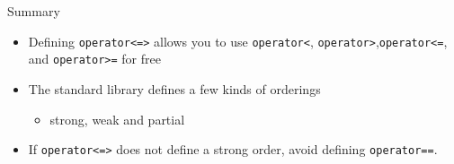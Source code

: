 \begin{frame}[fragile]
  \begin{block}{Summary}
    \begin{itemize}
      \item Defining \texttt{operator<=>} allows you to use \texttt{operator<}, \texttt{operator>},\texttt{operator<=}, and \texttt{operator>=} for free
      \item The standard library defines a few kinds of orderings
        \begin{itemize}
          \item strong, weak and partial
        \end{itemize}
      \item If \texttt{operator<=>} does not define a strong order, avoid defining \texttt{operator==}.
    \end{itemize}
  \end{block}
\end{frame}
